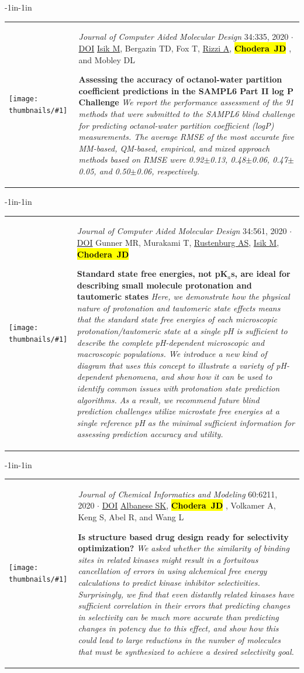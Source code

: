 \documentclass[10pt]{article}
\newcommand{\newarticle}[7]{
\begin{adjustwidth}{-1in}{-1in}  
\begin{tabular}{p{0.9in}p{7in}}
\parbox[c]{0.9in}{\texttt{[image: thumbnails/\#1]}} & \parbox[c]{6in}{\setstretch{0.9} {\small #4} $\cdot$ \href{#6}{#5} \\ {\footnotesize {#2}} \\ \raggedright { \bf\nohyphens{#3}}  \\ {\footnotesize\emph {#7}}} %
\end{tabular}
\end{adjustwidth}
\vspace{0.2in}
}
\newcommand{\jdc}{ {\bf \hl{Chodera~JD}} } %
\begin{document}
\newarticle{sampl6-logP-assessment}{\underline{Isik M}, Bergazin TD, Fox T, \underline{Rizzi A}, \jdc, and Mobley DL}{Assessing the accuracy of octanol-water partition coefficient predictions in the SAMPL6 Part II log P Challenge}{\emph{Journal of Computer Aided Molecular Design} 34:335, 2020}{DOI}{http://doi.org/10.1007/s10822-020-00295-0}{We report the performance assessment of the 91 methods that were submitted to the SAMPL6 blind challenge for predicting octanol-water partition coefficient (logP) measurements. The average RMSE of the most accurate five MM-based, QM-based, empirical, and mixed approach methods based on RMSE were 0.92$\pm$0.13, 0.48$\pm$0.06, 0.47$\pm$0.05, and 0.50$\pm$0.06, respectively.}

\newarticle{pka-free-energies}{Gunner MR, Murakami T, \underline{Rustenburg AS}, \underline{Isik M}, \jdc}{Standard state free energies, not pK$_a$s, are ideal for describing small molecule protonation and tautomeric states}{\emph{Journal of Computer Aided Molecular Design} 34:561, 2020}{DOI}{https://doi.org/10.1007/s10822-020-00280-7}{Here, we demonstrate how the physical nature of protonation and tautomeric state effects means that the standard state free energies of each microscopic protonation/tautomeric state at a single pH is sufficient to describe the complete pH-dependent microscopic and macroscopic populations. We introduce a new kind of diagram that uses this concept to illustrate a variety of pH-dependent phenomena, and show how it can be used to identify common issues with protonation state prediction algorithms. As a result, we recommend future blind prediction challenges utilize microstate free energies at a single reference pH as the minimal sufficient information for assessing prediction accuracy and utility.}

\newarticle{kinase-selectivity-paper}{\underline{Albanese SK}, \jdc, Volkamer A, Keng S, Abel R, and Wang L}{Is structure based drug design ready for selectivity optimization?}{\emph{Journal of Chemical Informatics and Modeling} 60:6211, 2020}{DOI}{https://doi.org/10.1021/acs.jcim.0c00815}{We asked whether the similarity of binding sites in related kinases might result in a fortuitous cancellation of errors in using alchemical free energy calculations to predict kinase inhibitor selectivities. Surprisingly, we find that even distantly related kinases have sufficient correlation in their errors that predicting changes in selectivity can be much more accurate than predicting changes in potency due to this effect, and show how this could lead to large reductions in the number of molecules that must be synthesized to achieve a desired selectivity goal.}
\end{document}
